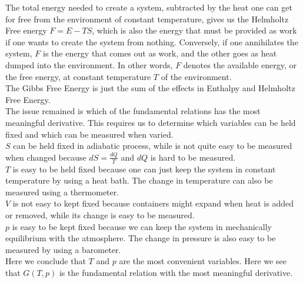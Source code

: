 \documentclass[11pt,oneside]{book}
\theoremstyle{break}
\theoremstyle{break}
\begin{document}
The total energy needed to create a system, subtracted by the heat one can get for free from the environment of constant temperature, gives us the Helmholtz Free energy $F=E-TS$, which is also the energy that must be provided as work if one wants to create the system from nothing. Conversely, if one annihilates the system, $F$ is the energy that comes out as work, and the other goes as heat dumped into the environment. In other words, $F$ denotes the available energy, or the free energy, at constant temperature $T$ of the environment.\\

The Gibbs Free Energy is just the sum of the effects in Enthalpy and Helmholtz Free Energy.\\

The issue remained is which of the fundamental relations has the most meaningful derivative. This requires us to determine which variables can be held fixed and which can be measured when varied.\\

$S$ can be held fixed in adiabatic process, while is not quite easy to be measured when changed because $dS = \frac{dQ}{T}$ and $dQ$ is hard to be measured.\\

$T$ is easy to be held fixed because one can just keep the system in constant temperature by using a heat bath. The change in temperature can also be measured using a thermometer.\\

$V$ is not easy to kept fixed because containers might expand when heat is added or removed, while its change is easy to be measured.\\

$p$ is easy to be kept fixed because we can keep the system in mechanically equilibrium with the atmosphere. The change in pressure is also easy to be measured by using a barometer.\\

Here we conclude that $T$ and $p$ are the most convenient variables. Here we see that $G(T,p)$ is the fundamental relation with the most meaningful derivative. \\
\end{document}
